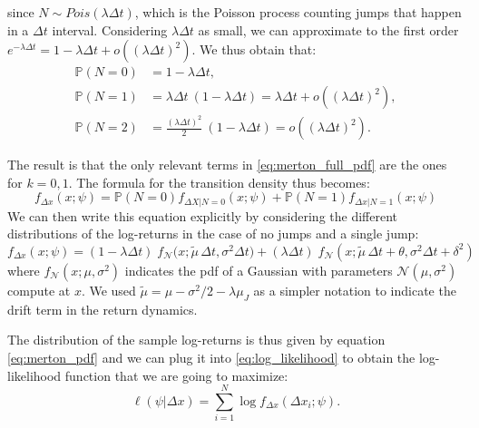 since $N \sim Pois(\lambda \Delta t)$, which is the Poisson process counting jumps that happen in a $\Delta t$ interval.
Considering $\lambda \Delta t$ as small, we can approximate to the first order  $e^{-\lambda \Delta t} =  1 - \lambda \Delta t +  o((\lambda \Delta t)^2)$. 
We thus obtain that:
\begin{subequations}
	\begin{align}
	\mathbb{P}(N = 0) &= 1-\lambda \Delta t , \\
	\mathbb{P}(N = 1) &= \lambda \Delta t \: (1- \lambda \Delta t) = \lambda \Delta t + o((\lambda \Delta t)^2), \\
	\mathbb{P}(N = 2) &= \frac{(\lambda \Delta t)^2}{2} \: (1-\lambda \Delta t) = o((\lambda \Delta t)^2).
	\end{align}
\end{subequations}


The result is that the only relevant terms in \eqref{eq:merton_full_pdf} are the ones for $ k = 0, 1$.
The formula for the transition density thus  becomes:
\begin{equation}
f_{\Delta x} (x; \psi) = \mathbb{P}(N = 0) f_{\Delta X | N = 0}(x; \psi) + \mathbb{P}(N = 1) f_{\Delta x | N = 1}(x; \psi)
\end{equation}
We can then write this equation explicitly by considering the different distributions of the log-returns in the case of no jumps and a single jump:
\begin{equation}
\label{eq:merton_pdf}
f_{\Delta x} (x; \psi) = (1 - \lambda \Delta t) \;
f_{\mathcal{N}}\Big(x ; \widetilde{\mu}\, \Delta t, \sigma^2 \Delta t\Big) + (\lambda \Delta t)\; f_{\mathcal{N}}(x ; \widetilde{\mu}\, \Delta t + \theta, \sigma^2 \Delta t+\delta^2)
\end{equation}
where $f_{\mathcal{N}}(x ; \mu, \sigma^2)$ indicates the pdf of a Gaussian with parameters $\mathcal{N}(\mu, \sigma^2)$ compute at $x$. We used $\widetilde{\mu} = \mu - \sigma^2/2 -\lambda \mu_J$ as a simpler notation to indicate the drift term in the return dynamics.

The distribution of the sample log-returns is thus given by equation \eqref{eq:merton_pdf} and we can plug it into \eqref{eq:log_likelihood} to obtain the log-likelihood function that we are going to maximize:
\begin{equation}
\label{eq:merton_loglikelihood_single}
	\ell(\psi |  \Delta x) = \sum_{i=1}^{N} \log f_{ \Delta x}(\Delta x_{i}; \psi).
\end{equation}

